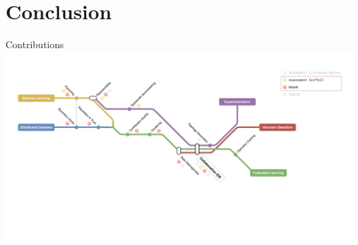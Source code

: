 


\section*{Conclusion}

\begin{frame}
  \sectionpage
\end{frame}

\begin{frame}{Contributions}
  \centering
  \includegraphics[width=1.1\textwidth, center]{figures/intro/metro/12.pdf}%
  
\end{frame}



